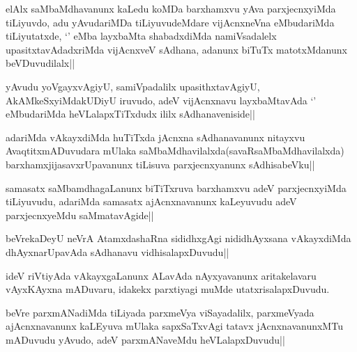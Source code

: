 
\begin{artha}
elAlx saMbaMdhavanunx kaLedu koMDa barxhamxvu yAva parxjecnxyiMda tiLiyuvdo, adu yAvudariMDa tiLiyuvudeMdare vijAcnxneVna eMbudariMda tiLiyutatxde, `\stext' eMba layxbaMta shabadxdiMda namiVsadalelx upasitxtavAdadxriMda vijAcnxveV sAdhana, adanunx biTuTx matotxMdanunx beVDuvudilalx||
\end{artha}

\begin{artha}
yAvudu yoVgayxvAgiyU, samiVpadalilx upasithxtavAgiyU, AkAMkeSxyiMdakUDiyU iruvudo, adeV vijAcnxnavu layxbaMtavAda `\stext' eMbudariMda heVLalapxTiTxdudx ililx sAdhanaveniside||
\end{artha}

\begin{artha}
adariMda vAkayxdiMda huTiTxda jAcnxna sAdhanavanunx nitayxvu AvaqtitxmADuvudara mUlaka saMbaMdhavilalxda(savaRsaMbaMdhavilalxda) barxhamxjijasavxrUpavanunx tiLisuva parxjecnxyanunx sAdhisabeVku||
\end{artha}

\begin{artha}
samasatx saMbamdhagaLanunx biTiTxruva barxhamxvu adeV parxjecnxyiMda tiLiyuvudu, adariMda samasatx ajAcnxnavanunx kaLeyuvudu adeV parxjecnxyeMdu saMmatavAgide||
\end{artha}


\begin{artha}
beVrekaDeyU neVrA AtamxdashaRna sididhxgAgi nididhAyxsana vAkayxdiMda dhAyxnarUpavAda sAdhanavu vidhisalapxDuvudu||
\end{artha}

\begin{artha}
ideV riVtiyAda vAkayxgaLanunx ALavAda nAyxyavanunx aritakelavaru vAyxKAyxna mADuvaru, idakekx parxtiyagi muMde utatxrisalapxDuvudu.
\end{artha}


\begin{artha}
beVre parxmANadiMda tiLiyada parxmeVya viSayadalilx, parxmeVyada ajAcnxnavanunx kaLEyuva mUlaka sapxSaTxvAgi tatavx jAcnxnavanunxMTu mADuvudu yAvudo, adeV parxmANaveMdu heVLalapxDuvudu||
\end{artha}


